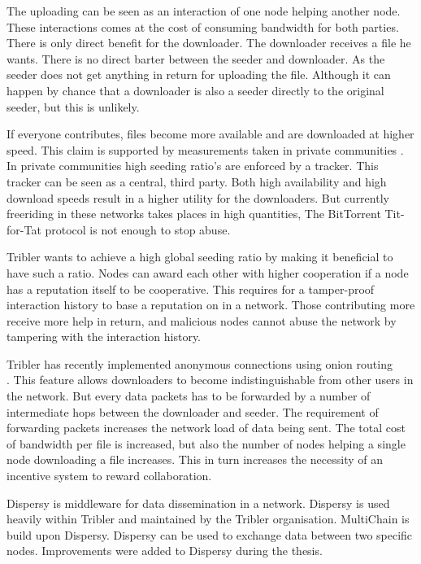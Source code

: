 The uploading can be seen as an interaction of one node helping another node.
These interactions comes at the cost of consuming bandwidth for both parties.
There is only direct benefit for the downloader.
The downloader receives a file he wants.
There is no direct barter between the seeder and downloader.
As the seeder does not get anything in return for uploading the file.
Although it can happen by chance that a downloader is also a seeder directly to the original seeder,
but this is unlikely\cite{Lai-Incentives}.

If everyone contributes, files become more available and are downloaded at higher speed.
This claim is supported by measurements taken in private communities
\cite{meulpolder-privatecommunities}.
In private communities high seeding ratio's are enforced by a tracker.
This tracker can be seen as a central, third party.
Both high availability and high download speeds result in a higher utility for the downloaders.
But currently freeriding in these networks takes places in high quantities\cite{Adar-Freeriding},
The BitTorrent Tit-for-Tat protocol is not enough to stop abuse\cite{Pouwelse-tribler}.

Tribler wants to achieve a high global seeding ratio by making it beneficial to have such a ratio.
Nodes can award each other with higher cooperation if a node has a reputation itself to be cooperative.
This requires for a tamper-proof interaction history to base a reputation on in a network.
Those contributing more receive more help in return,
and malicious nodes cannot abuse the network by tampering with the interaction history.

Tribler has recently implemented anonymous connections using onion routing \\\cite{Plak-anonymous}\cite{ruigrok-anonymous}.
This feature allows downloaders to become indistinguishable from other users in the network.
But every data packets has to be forwarded
by a number of intermediate hops between the downloader and seeder\cite{Plak-anonymous}.
The requirement of forwarding packets increases the network load of data being sent.
The total cost of bandwidth per file is increased,
but also the number of nodes helping a single node downloading a file increases.
This in turn increases the necessity of an incentive system to reward collaboration.

Dispersy is middleware for data dissemination in a network.
Dispersy is used heavily within Tribler and maintained by the Tribler organisation.
MultiChain is build upon Dispersy.
Dispersy can be used to exchange data between two specific nodes\cite{zeilemaker-dispersy}.
Improvements were added to Dispersy during the thesis.

